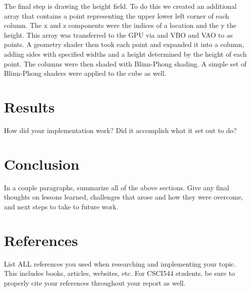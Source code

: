 \documentclass[12pt,titlepage]{article}
\begin{document}
The final step is drawing the height field.  To do this we created an additional array that contains a point representing the upper lower left corner of each column.  The x and z components were the indices of a location and the y the height.  This array was transferred to the GPU via and VBO and VAO to as points.  A geometry shader then took each point and expanded it into a column, adding sides with specified widths and a height determined by the height of each point.  The columns were then shaded with Blinn-Phong shading.  A simple set of Blinn-Phong shaders were applied to the cube as well.

\section{Results}

How did your implementation work? Did it accomplish what it set out to do?

\section{Conclusion}

In a couple paragraphs, summarize all of the above sections. Give any final thoughts on lessons learned, challenges that arose and how they were overcome, and next steps to take to future work.

\section{References}

List ALL references you used when researching and implementing your topic. This includes books, articles, websites, etc. For CSCI544 students, be sure to properly cite your references throughout your report as well.
\end{document}
